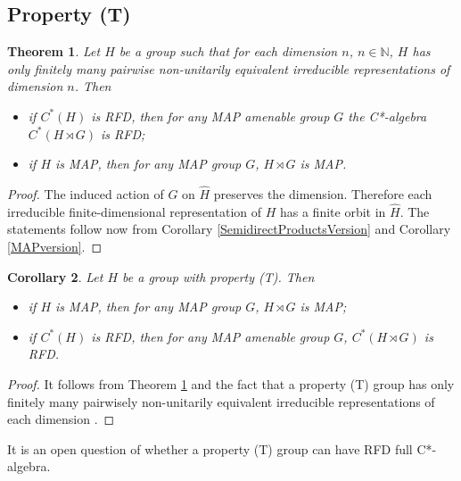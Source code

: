 \documentclass[11 pt, leqno, hidelinks]{amsart}%
\newtheorem{theorem}{Theorem}[section]
\theoremstyle{plain}
\newtheorem{corollary}[theorem]{Corollary}
\numberwithin{equation}{section}
\begin{document}
\smallskip



\subsection{Property (T)} \label{subsec:T}



\begin{theorem}\label{FinManyIrreps} Let $H$ be a group  such that for each dimension $n$, $n\in \mathbb N$, $H$ has only finitely many pairwise non-unitarily equivalent  irreducible representations of dimension $n$.   Then
 \begin{itemize}
\item [(i)] if  $C^*(H)$ is RFD, then  for any  MAP amenable group   $G$ the C*-algebra   $C^*(H\rtimes G)$ is RFD;

\item [(ii)]  if $H$ is MAP, then for any MAP group $G$,   $H\rtimes G$ is MAP.

\end{itemize}
\end{theorem}
\begin{proof} The induced action of $G$ on $\widehat H$ preserves the dimension. Therefore each irreducible finite-dimensional representation of $H$ has a  finite orbit in $\widehat H$.  The statements follow now from Corollary \ref{SemidirectProductsVersion} and Corollary \ref{MAPversion}.
\end{proof}


\begin{corollary} \label{cor:T} Let $H$ be a group with  property (T). Then
 \begin{itemize}
\item [(i)]  if $H$ is MAP, then for any MAP group $G$,  $H\rtimes G$ is MAP;

\item [(ii)] if $C^*(H)$  is RFD, then for any MAP amenable group $G$,  $C^*(H\rtimes G)$ is RFD.
\end{itemize}
\end{corollary}
\begin{proof}
It follows from Theorem \ref{FinManyIrreps} and  the fact that a property (T) group has only finitely many pairwisely non-unitarily equivalent  irreducible representations of each dimension \cite[Theorem 2.6]{Wang}.
\end{proof}

It is an open question of whether a  property (T) group can have RFD full C*-algebra.
\end{document}
